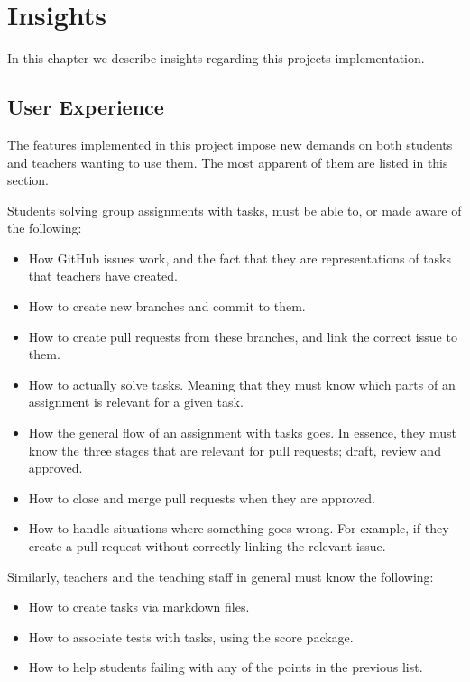 
\chapter{Insights}

In this chapter we describe insights regarding this projects implementation.

\section{User Experience}

The features implemented in this project impose new demands on both students and teachers wanting to use them.
The most apparent of them are listed in this section.

Students solving group assignments with tasks, must be able to, or made aware of the following:
\begin{itemize}
    \item How GitHub issues work, and the fact that they are representations of tasks that teachers have created.
    \item How to create new branches and commit to them.
    \item How to create pull requests from these branches, and link the correct issue to them.
    \item How to actually solve tasks.
    Meaning that they must know which parts of an assignment is relevant for a given task.
    \item How the general flow of an assignment with tasks goes.
    In essence, they must know the three stages that are relevant for pull requests; draft, review and approved.
    \item How to close and merge pull requests when they are approved.
    \item How to handle situations where something goes wrong.
    For example, if they create a pull request without correctly linking the relevant issue.
\end{itemize}

Similarly, teachers and the teaching staff in general must know the following:
\begin{itemize}
    \item How to create tasks via markdown files.
    \item How to associate tests with tasks, using the score package.
    \item How to help students failing with any of the points in the previous list.
\end{itemize}

